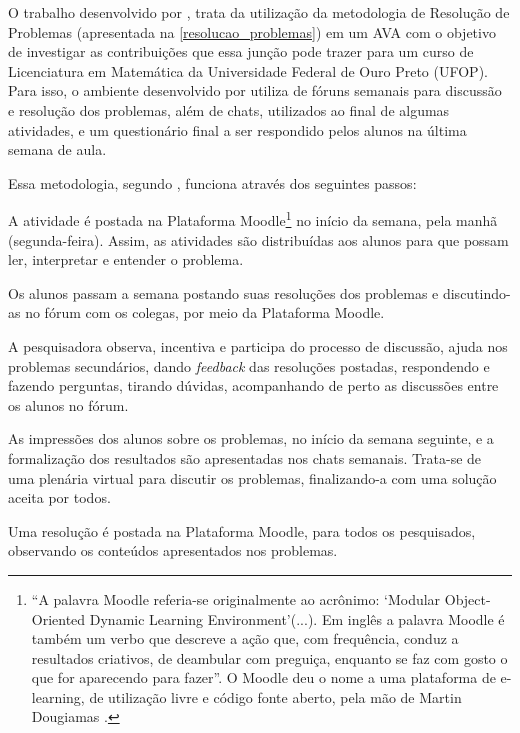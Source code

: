 O trabalho desenvolvido por , trata da utilização da metodologia de Resolução de Problemas (apresentada na \autoref{resolucao_problemas}) em um AVA com o objetivo de 
investigar as contribuições que essa jun\c{c}\~ao pode trazer para um curso de Licenciatura em Matem\'atica da Universidade Federal de Ouro Preto (UFOP). Para isso, 
o ambiente desenvolvido por  utiliza de fóruns semanais para discussão e resolução dos problemas, além de chats, utilizados ao final de algumas atividades, e um 
questionário final a ser respondido pelos alunos na última semana de aula.

Essa metodologia, segundo , funciona atrav\'es dos seguintes passos:
\begin{alineascomnumero}
	\item A atividade é postada na Plataforma Moodle\footnote{``A  palavra  Moodle  referia-se  originalmente  ao  acrônimo:  `Modular Object-Oriented  Dynamic  Learning  Environment'(...).  Em  inglês  a  palavra Moodle é também um verbo que descreve a ação que, com frequência, conduz a resultados criativos, de deambular com preguiça, enquanto se faz com gosto o  que  for  aparecendo  para  fazer''. O  Moodle  deu  o  nome  a  uma  plataforma  de  e-learning,  de  utilização livre  e  código  fonte  aberto,  pela  mão  de  Martin  Dougiamas \cite{oro29585}.} no início da semana, pela manhã (segunda-feira).  Assim,  as  atividades  são  distribuídas  aos  alunos  para  que possam ler, interpretar e entender o problema. 
	\item Os  alunos  passam a  semana  postando  suas  resoluções  dos  problemas e discutindo-as no fórum com os colegas, por meio da Plataforma Moodle. 
	\item A  pesquisadora  observa,  incentiva  e  participa  do  processo  de discussão, ajuda nos problemas secundários, dando \textit{feedback} das resoluções postadas, respondendo e fazendo 
perguntas, tirando  dúvidas, acompanhando de perto as discussões entre os alunos no fórum.
	\item As impressões dos alunos sobre os problemas, no início da semana seguinte, e a formalização dos resultados são apresentadas nos chats semanais. Trata-se  de  uma  plenária  virtual  para  discutir  os  problemas,  finalizando-a  com  uma solução aceita por todos. 
	\item Uma resolução é postada na Plataforma Moodle, para todos os pesquisados, observando os conteúdos apresentados nos problemas. 
\end{alineascomnumero}

